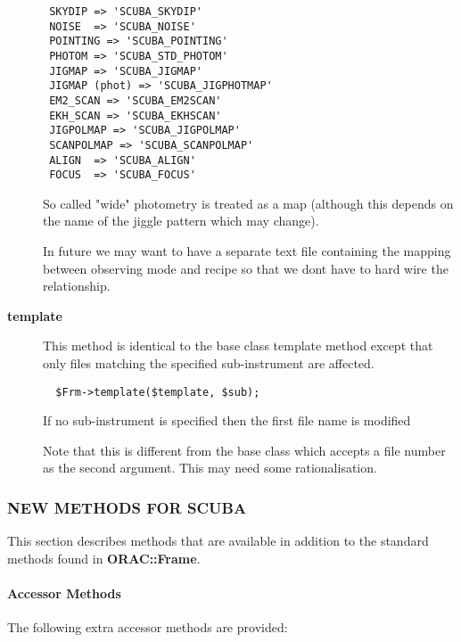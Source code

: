 \begin{description}
\begin{verbatim}
 SKYDIP => 'SCUBA_SKYDIP'
 NOISE  => 'SCUBA_NOISE'
 POINTING => 'SCUBA_POINTING'
 PHOTOM => 'SCUBA_STD_PHOTOM'
 JIGMAP => 'SCUBA_JIGMAP'
 JIGMAP (phot) => 'SCUBA_JIGPHOTMAP'
 EM2_SCAN => 'SCUBA_EM2SCAN'
 EKH_SCAN => 'SCUBA_EKHSCAN'
 JIGPOLMAP => 'SCUBA_JIGPOLMAP'
 SCANPOLMAP => 'SCUBA_SCANPOLMAP'
 ALIGN  => 'SCUBA_ALIGN'
 FOCUS  => 'SCUBA_FOCUS'
\end{verbatim}


So called "wide" photometry is treated as a map (although this
depends on the name of the jiggle pattern which may change).



In future we may want to have a separate text file containing
the mapping between observing mode and recipe so that
we dont have to hard wire the relationship.


\item[{\textbf{template}}] \mbox{}

This method is identical to the base class template method
except that only files matching the specified sub-instrument
are affected.

\begin{verbatim}
  $Frm->template($template, $sub);
\end{verbatim}


If no sub-instrument is specified then the first file name
is modified



Note that this is different from the base class which accepts
a file number as the second argument. This may need some
rationalisation.

\end{description}
\subsubsection*{NEW METHODS FOR SCUBA\label{ORAC::Frame::SCUBA_NEW_METHODS_FOR_SCUBA}}


This section describes methods that are available in addition
to the standard methods found in \textbf{ORAC::Frame}.

\paragraph*{Accessor Methods\label{ORAC::Frame::SCUBA_Accessor_Methods}}


The following extra accessor methods are provided:

